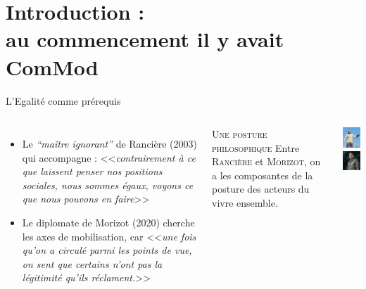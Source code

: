 \documentclass[newPxFont]{beamer}
\begin{document}
\section{Introduction :\\ au commencement il y avait ComMod}
  \begin{frame}[c]{L'Egalité comme prérequis}
    \vspace{-1cm}
    \begin{columns}[onlytextwidth,T]
      \column{\dimexpr\linewidth-30mm-5mm}
          \begin{itemize}
            \item Le \textit{``maître ignorant''} de Rancière (2003) qui accompagne : <<\emph{contrairement à ce que laissent penser nos positions sociales, nous sommes égaux, voyons ce que nous pouvons en faire}>>
            \item Le diplomate de Morizot (2020) cherche les axes de mobilisation, car <<\emph{une fois qu’on a circulé parmi les points de vue, on sent que certains n’ont pas la légitimité qu’ils réclament.}>>
          \end{itemize}

          \small{
              \begin{alertblock}{\textsc{Une posture philosophique}}
                Entre \textsc{Rancière} et \textsc{Morizot}, on a les composantes de la posture des acteurs du vivre ensemble.
              \end{alertblock}
            }
      \column{30mm}
      \vspace{0.5cm}
            \includegraphics[width=3cm]{img/Ranciere.jpg}\\
            \includegraphics[width=3cm]{img/morizot.jpg}
    \end{columns}
  \end{frame}
\end{document}

